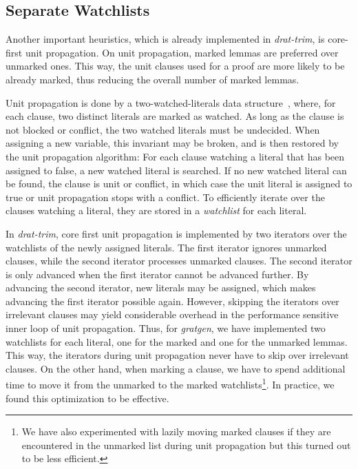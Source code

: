 \documentclass[smallcondensed]{svjour3}     %
\begin{document}
\subsection{Separate Watchlists}
Another important heuristics, which is already implemented in {\sl drat-trim}, is core-first unit propagation.
On unit propagation, marked lemmas are preferred over unmarked ones. This way, the unit clauses used for a proof are more likely to be already marked,
thus reducing the overall number of marked lemmas.

Unit propagation is done by a two-watched-literals data structure~\cite{MMZZ01},
where, for each clause, two distinct literals are marked as watched. As long as the clause is not blocked or conflict, the two watched literals must be undecided.
When assigning a new variable, this invariant may be broken, and is then restored by the unit propagation algorithm: For each clause watching a literal that has been 
assigned to false, a new watched literal is searched. If no new watched literal can be found, the clause is unit or conflict, in which case the unit literal is 
assigned to true or unit propagation stops with a conflict. To efficiently iterate over the clauses watching a literal, they are stored in a \emph{watchlist} for 
each literal.

In {\sl drat-trim}, core first unit propagation is implemented by two iterators over the watchlists of the newly assigned literals.
The first iterator ignores unmarked clauses, while 
the second iterator processes unmarked clauses. The second iterator is only advanced when the first iterator cannot be advanced further. By advancing the second 
iterator, new literals may be assigned, which makes advancing the first iterator possible again.
However, skipping the iterators over irrelevant clauses may yield considerable overhead in the performance sensitive inner loop of unit propagation.
Thus, for {\sl gratgen}, we have implemented two watchlists for each literal, one for the marked and one for the unmarked lemmas. 
This way, the iterators during unit propagation never have to skip over irrelevant clauses. On the other hand, when marking a clause, we have to spend additional time
to move it from the unmarked to the marked watchlists\footnote{We have also experimented with lazily moving marked clauses if they are encountered in the unmarked list during unit propagation but this turned out to be less efficient.}. In practice, we found this optimization to be effective.
\end{document}
